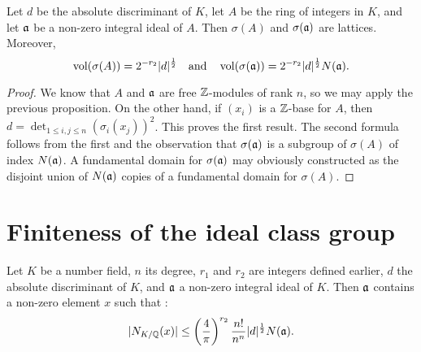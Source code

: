 \begin{prop}
  Let $d$ be the absolute discriminant of $K$, let $A$ be the ring of integers in $K$, and let $\mathfrak{a}$ be a non-zero integral ideal of $A$. Then $\sigma(A)$ and $\sigma(\mathfrak{a})$ are lattices. Moreover,
  \[\operatorname{vol}(\sigma(A)) = 2^{-r_2}|d|^{\frac12}\quad\text{and}\quad \operatorname{vol}(\sigma(\mathfrak{a})) = 2^{-r_2}|d|^{\frac12}N(\mathfrak{a}).\]
\end{prop}

\begin{proof}
  We know that $A$ and $\mathfrak{a}$ are free $\mathbb{Z}$-modules of rank $n$, so we may apply the previous proposition. On the other hand, if $(x_i)$ is a $\mathbb{Z}$-base for $A$, then $d = \det_{1\leq i,j\leq n}(\sigma_{i}(x_j))^2$. This proves the first result. The second formula follows from the first and the observation that $\sigma(\mathfrak{a})$ is a subgroup of $\sigma(A)$ of index $N(\mathfrak{a})$. A fundamental domain for $\sigma(\mathfrak{a})$ may obviously constructed as the disjoint union of $N(\mathfrak{a})$ copies of a fundamental domain for $\sigma(A)$.
\end{proof}

\section{Finiteness of the ideal class group}

\begin{prop}
  Let $K$ be a number field, $n$ its degree, $r_1$ and $r_2$ are integers defined earlier, $d$ the absolute discriminant of $K$, and $\mathfrak{a}$ a non-zero integral ideal of $K$. Then $\mathfrak{a}$ contains a non-zero element $x$ such that :
  \[|N_{K/\mathbb{Q}}(x)|\leq \left(\frac{4}{\pi}\right)^{r_2}\frac{n!}{n^n}|d|^{\frac12}N(\mathfrak{a}).\]
\end{prop}
